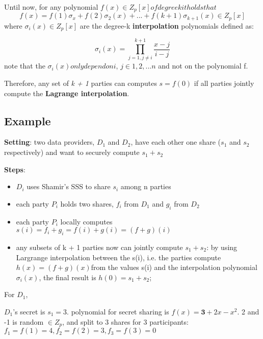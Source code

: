 \documentclass[a4paper,11pt]{article}
\begin{document}
Until now, for any polynomial $f(x) \in Z_{p}[x] of degree \textit{k} it holds that$
\begin{equation}　
f(x) = f(1)\sigma_{x} + f(2)\sigma_2(x) + ... + f(k+1)\sigma_{k+1}(x)   \in Z_{p}[x]  \label{equ:largrange}
\end{equation}
where $\sigma_{i}(x)  \in Z_{p}[x]$ are the degree-k \textbf{interpolation} polynomials defined as:

\begin{displaymath}
\sigma_{i}(x) = \prod_{j=1, j \neq i}^{k+1} \frac{x - j} {i - j}
\end{displaymath}
note that the $\sigma_{i}(x) only depend on \textit{i, j} \in {1, 2, ... n}$ and not on the polynomial f.

Therefore, any set of \textit{k + 1} parties can computes $s = f(0)$ if all parties jointly compute the \textbf{Lagrange interpolation}.

\subsection{Example}

\textbf{Setting}: two data providers, $D_1$ and $D_2$, have each other one share ($s_1$ and $s_2$ respectively) and want to securely compute $s_1 + s_2$

\textbf{Steps}: 

\begin{itemize}
\item $D_{i}$ uses Shamir's SSS to share $s_i$ among n parties
\item each party $P_i$ holds two shares, $f_i$ from $D_1$ and $g_i$ from $D_2$
\item each party $P_i$ locally computes $s(i) = f_i + g_i = f(i) + g(i) = (f+g)(i) $
\item any subsets of k + 1 parties now can jointly compute $s_1 + s_2$: by using Largrange interpolation between the s(i), i.e. the parties compute $h(x) = (f + g)(x) $from the values s(i) and the interpolation polynomial $\sigma_{i}(x)$, the final result is $h(0) = s_1 + s_2$; 

\end{itemize}

For $D_1$,

$D_{1}$'s secret is $s_1 = 3$. polynomial for secret sharing is $f(x) = \textbf{3} + 2x - x^{2} $.   2 and -1 is random $\in Z_p$, and split to 3 shares for 3 participants: 
$f_1 = f(1) = 4, f_2 = f(2) = 3, f_3 = f(3) = 0$
\end{document}
